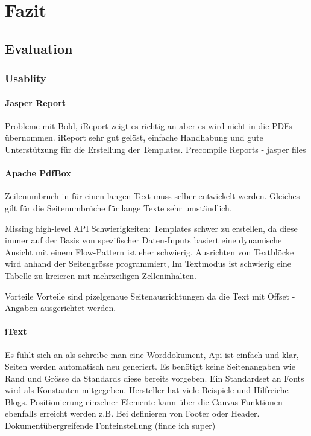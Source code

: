 \documentclass[main.tex]{subfiles}
\begin{document}
\chapter{Fazit}

\section{Evaluation}



\subsection{Usablity}

\subsubsection{Jasper Report}

Probleme mit Bold, iReport zeigt es richtig an aber es wird nicht in die PDFs übernommen. 
iReport sehr gut gelöst, einfache Handhabung und gute Unterstützung für die Erstellung der Templates. 
Precompile Reports - jasper files 


\subsubsection{Apache PdfBox}
Zeilenumbruch in für einen langen Text muss selber entwickelt werden. Gleiches gilt für die Seitenumbrüche für lange Texte sehr umständlich.

Missing high-level API
Schwierigkeiten: 
Templates schwer zu erstellen, da diese immer auf der Basis von spezifischer Daten-Inputs basiert eine dynamische Ansicht mit einem Flow-Pattern ist eher schwierig. Ausrichten von Textblöcke wird anhand der Seitengrösse  programmiert, 
Im Textmodus ist schwierig eine Tabelle zu kreieren mit mehrzeiligen Zelleninhalten.

Vorteile
Vorteile sind pizelgenaue Seitenausrichtungen da die Text mit Offset -Angaben ausgerichtet werden. 



\subsubsection{iText}
Es fühlt sich an als schreibe man eine Worddokument, Api ist einfach und klar, Seiten werden automatisch neu generiert. Es benötigt keine Seitenangaben wie Rand und Grösse da Standards diese bereits vorgeben. Ein Standardset an Fonts wird als Konstanten mitgegeben. Hersteller hat viele Beispiele und Hilfreiche Blogs. 
Positionierung einzelner Elemente kann über die Canvas Funktionen ebenfalls erreicht werden z.B.  Bei definieren von Footer oder Header. 
Dokumentübergreifende Fonteinstellung (finde ich super)
\end{document}
